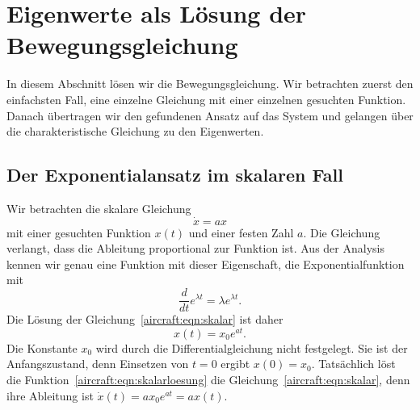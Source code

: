 %
%
%

\section{Eigenwerte als Lösung der Bewegungsgleichung
\label{aircraft:section:4-eigenwerte}}
In diesem Abschnitt lösen wir die Bewegungsgleichung.
Wir betrachten zuerst den einfachsten Fall, eine einzelne Gleichung
mit einer einzelnen gesuchten Funktion.
Danach übertragen wir den gefundenen Ansatz auf das System und
gelangen über die charakteristische Gleichung zu den Eigenwerten.

\subsection{Der Exponentialansatz im skalaren Fall
\label{aircraft:subsection:exponentialansatz}}
Wir betrachten die skalare Gleichung
\begin{equation}
    \dot{x}
    =
    ax
    \label{aircraft:eqn:skalar}
\end{equation}
mit einer gesuchten Funktion $x(t)$ und einer festen Zahl $a$.
Die Gleichung verlangt, dass die Ableitung proportional zur Funktion
ist.
Aus der Analysis kennen wir genau eine Funktion mit dieser
Eigenschaft, die Exponentialfunktion mit
\begin{equation}
    \frac{d}{dt} e^{\lambda t}
    =
    \lambda e^{\lambda t}.
    \label{aircraft:eqn:expableitung}
\end{equation}
Die Lösung der Gleichung~\eqref{aircraft:eqn:skalar} ist daher
\begin{equation}
    x(t)
    =
    x_0 e^{at}.
    \label{aircraft:eqn:skalarloesung}
\end{equation}
Die Konstante $x_0$ wird durch die Differentialgleichung nicht
festgelegt.
Sie ist der Anfangszustand, denn Einsetzen von $t = 0$ ergibt
$x(0) = x_0$.
Tatsächlich löst die Funktion~\eqref{aircraft:eqn:skalarloesung} die
Gleichung~\eqref{aircraft:eqn:skalar}, denn ihre Ableitung ist
$\dot{x}(t) = a x_0 e^{at} = a x(t)$.

